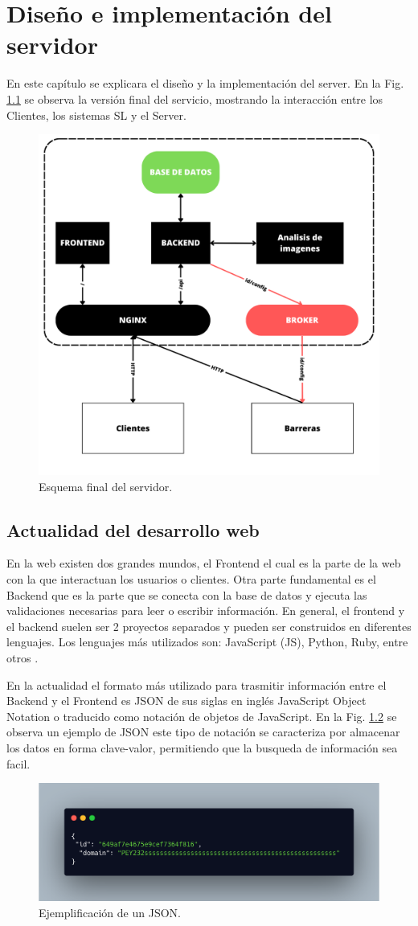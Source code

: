 \chapter{Diseño e implementación del servidor}

En este capítulo se explicara el diseño y la implementación del server. En la Fig. \ref{fig:server-final} se observa la versión final del servicio, mostrando la interacción entre los Clientes, los sistemas SL y el Server.

\begin{figure}[h]
    \centering
    \includegraphics[width=.4\textwidth]{imgs/server-esquema.png}
    \caption{Esquema final del servidor.}
    \label{fig:server-final}
\end{figure}


\section{Actualidad del desarrollo web}

En la web existen dos grandes mundos, el Frontend el cual es la parte de la web con la que interactuan los usuarios o clientes. Otra parte fundamental es el Backend que es la parte que se conecta con la base de datos y ejecuta las validaciones necesarias para leer o escribir información. En general, el frontend y el backend suelen ser 2 proyectos separados y pueden ser construidos en diferentes lenguajes. Los lenguajes más utilizados son: JavaScript (JS), Python, Ruby, entre otros \cite{presta_10_2021}.

En la actualidad el formato más utilizado para trasmitir información entre el Backend y el Frontend es JSON de sus siglas en inglés JavaScript Object Notation o traducido como notación de objetos de JavaScript. En la Fig. \ref{fig:ejemplo-json} se observa un ejemplo de JSON este tipo de notación se caracteriza por almacenar los datos en forma clave-valor, permitiendo que la busqueda de información sea facil.

\begin{figure}
    \centering
    \includegraphics[width=.5\textwidth]{imgs/json-example.png}
    \caption{Ejemplificación de un JSON.}
    \label{fig:ejemplo-json}
\end{figure}

